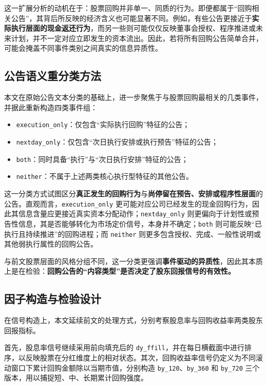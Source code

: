 \documentclass[a4paper,10pt]{article}
\begin{document}
这一扩展分析的动机在于：股票回购并非单一、同质的行为。即便都属于“回购相关公告”，其背后所反映的经济含义也可能显著不同。例如，有些公告更接近于\textbf{实际执行层面的现金返还行为}，而另一些则可能仅仅反映董事会授权、程序推进或未来计划，并不一定对应立即发生的资本流出。因此，若将所有回购公告简单合并，可能会掩盖不同事件类别之间真实的信息异质性。

\subsection{公告语义重分类方法}

本文在原始公告文本分类的基础上，进一步聚焦于与股票回购最相关的几类事件，并据此重新构造四类事件组：
\begin{itemize}
    \item \texttt{execution\_only}：仅包含“实际执行回购”特征的公告；
    \item \texttt{nextday\_only}：仅包含“次日执行安排或执行预告”特征的公告；
    \item \texttt{both}：同时具备“执行”与“次日执行安排”特征的公告；
    \item \texttt{neither}：不属于上述两类核心执行型特征的其他公告。
\end{itemize}

这一分类方式试图区分\textbf{真正发生的回购行为}与\textbf{尚停留在预告、安排或程序性层面}的公告。直观而言，\texttt{execution\_only} 更可能对应公司已经发生的现金回购行为，因此其信息含量应更接近真实资本分配动作；\texttt{nextday\_only} 则更偏向于计划性或预告性信息，其是否能够转化为市场定价信号，本身并不确定；\texttt{both} 则可能反映“已执行且持续推进”的回购进程；而 \texttt{neither} 则更多包含授权、完成、一般性说明或其他弱执行属性的回购公告。

与前文股票层面的风格分组不同，这一分类更强调\textbf{事件驱动的异质性}，因此其本质上是在检验：\textbf{回购公告的“内容类型”是否决定了股东回报信号的有效性。}

\subsection{因子构造与检验设计}

在信号构造上，本文延续前文的处理方式，分别考察股息率与回购收益率两类股东回报指标。

首先，股息率信号继续采用前向填充后的 \texttt{dy\_ffill}，并在每日横截面中进行排序，以反映股票在分红维度上的相对状态。其次，回购收益率信号仍定义为不同滚动窗口下累计回购金额除以当期市值，分别构造 \texttt{by\_120}、\texttt{by\_360} 和 \texttt{by\_720} 三个版本，用以捕捉短、中、长期累计回购强度。
\end{document}
